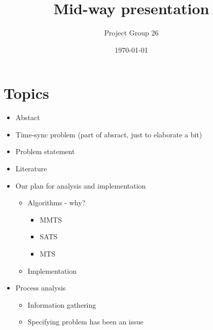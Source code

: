 \documentclass{article}
\title{Mid-way presentation}
\author{Project Group 26}
\date{\today}
\begin{document}
\maketitle

\section{Topics}

\begin{itemize}
    \item Abstact
    \item Time-sync problem (part of absract, just to elaborate a bit)
    \item Problem statement
    \item Literature
    \item Our plan for analysis and implementation
    \begin{itemize}
        \item Algorithms - why?
        \begin{itemize}
            \item MMTS
            \item SATS
            \item MTS
        \end{itemize}
        \item Implementation
    \end{itemize}
    \item Process analysis
    \begin{itemize}
        \item Information gathering
        \item Specifying problem has been an issue
        \end{itemize}
\end{itemize}
\end{document}
